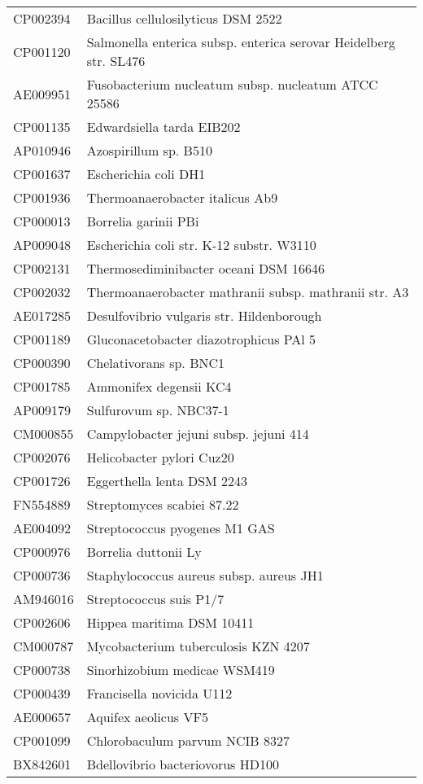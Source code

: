 \begin{longtable}{ll}
CP002394 & Bacillus cellulosilyticus DSM 2522\\
CP001120 & Salmonella enterica subsp. enterica serovar Heidelberg str. SL476\\
AE009951 & Fusobacterium nucleatum subsp. nucleatum ATCC 25586\\
CP001135 & Edwardsiella tarda EIB202\\
AP010946 & Azospirillum sp. B510\\
CP001637 & Escherichia coli DH1\\
CP001936 & Thermoanaerobacter italicus Ab9\\
CP000013 & Borrelia garinii PBi\\
AP009048 & Escherichia coli str. K-12 substr. W3110\\
CP002131 & Thermosediminibacter oceani DSM 16646\\
CP002032 & Thermoanaerobacter mathranii subsp. mathranii str. A3\\
AE017285 & Desulfovibrio vulgaris str. Hildenborough\\
CP001189 & Gluconacetobacter diazotrophicus PAl 5\\
CP000390 & Chelativorans sp. BNC1\\
CP001785 & Ammonifex degensii KC4\\
AP009179 & Sulfurovum sp. NBC37-1\\
CM000855 & Campylobacter jejuni subsp. jejuni 414\\
CP002076 & Helicobacter pylori Cuz20\\
CP001726 & Eggerthella lenta DSM 2243\\
FN554889 & Streptomyces scabiei 87.22\\
AE004092 & Streptococcus pyogenes M1 GAS\\
CP000976 & Borrelia duttonii Ly\\
CP000736 & Staphylococcus aureus subsp. aureus JH1\\
AM946016 & Streptococcus suis P1/7\\
CP002606 & Hippea maritima DSM 10411\\
CM000787 & Mycobacterium tuberculosis KZN 4207\\
CP000738 & Sinorhizobium medicae WSM419\\
CP000439 & Francisella novicida U112\\
AE000657 & Aquifex aeolicus VF5\\
CP001099 & Chlorobaculum parvum NCIB 8327\\
BX842601 & Bdellovibrio bacteriovorus HD100\\

\end{longtable}
